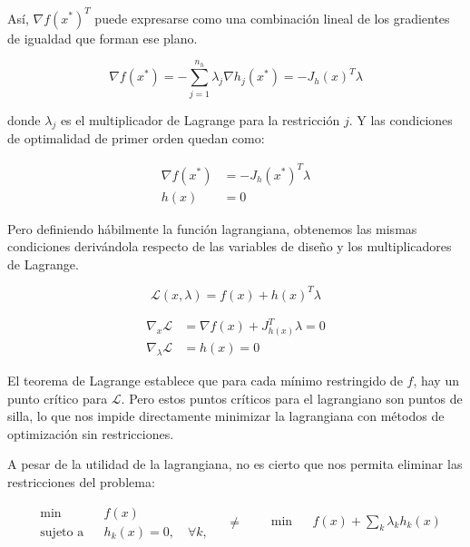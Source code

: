 Así, $\nabla f(x^*)^T$ puede expresarse como una combinación lineal de los
gradientes de igualdad que forman ese plano.

\begin{equation}
	\nabla f(x^*) = - \sum_{j=1}^{n_h} \lambda_j \nabla h_j(x^*) = - J_h(x)^T \lambda
\end{equation}

donde $\lambda_j$ es el multiplicador de Lagrange para la restricción $j$. Y
las condiciones de optimalidad de primer orden quedan como:

\begin{equation}
	\begin{aligned}
		\nabla f(x^*) & = -J_h(x^*)^T \lambda \\
		h(x)          & = 0
	\end{aligned}
\end{equation}

Pero definiendo hábilmente la función lagrangiana, obtenemos las mismas
condiciones derivándola respecto de las variables de diseño y los
multiplicadores de Lagrange.

\begin{equation}
	\mathcal{L}(x, \lambda) = f(x) + h(x)^T \lambda
\end{equation}

\begin{equation}
	\begin{aligned}
		\nabla_x \mathcal{L}         & = \nabla f(x) + J_{h(x)}^T \lambda = 0 \\
		\nabla_{\lambda} \mathcal{L} & = h(x) = 0
	\end{aligned}
\end{equation}

El teorema de Lagrange establece que para cada mínimo restringido de $f$, hay
un punto crítico para $\mathcal{L}$. Pero estos puntos críticos para el
lagrangiano son puntos de silla, lo que nos impide directamente minimizar la
lagrangiana con métodos de optimización sin restricciones.

A pesar de la utilidad de la lagrangiana, no es cierto que nos permita eliminar las
restricciones del problema:

\begin{equation}
	\begin{aligned}
		 & \min
		 &                 & f(x)                         \\
		 & \text{sujeto a}
		 &                 & h_k(x) = 0, \quad \forall k,
	\end{aligned}
	\quad \neq \quad
	\begin{aligned}
		 & \min
		 &      & f(x) + \sum_{k} \lambda_k h_k(x)
	\end{aligned}
\end{equation}


